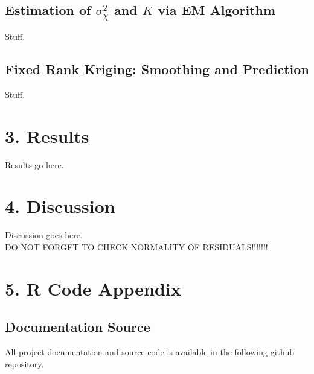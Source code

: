 \documentclass[11pt]{article}
\begin{document}
\subsection{Estimation of $\sigma^2_{\chi}$ and $K$ via EM Algorithm}

Stuff.\\

\subsection{Fixed Rank Kriging: Smoothing and Prediction}

Stuff.\\


\newpage
\section{3. Results}

Results go here. \\

\newpage
\section{4. Discussion}

Discussion goes here. \\

DO NOT FORGET TO CHECK NORMALITY OF RESIDUALS!!!!!!!\\

\newpage
\section{5. R Code Appendix}

\subsection{Documentation Source}
All project documentation and source code is available in the following github repository. \\
\end{document}
